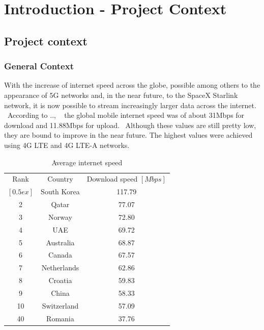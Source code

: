 
\chapter{Introduction - Project Context}
\label{ch:introduction}
\pagestyle{headings}

\section{Project context}
\label{sec:introduction-context}

\subsection{General Context}
\label{subsec:introduction-general-context}
With the increase of internet speed across the globe, possible among others to the appearance of 5G networks and, in
the near future, to the SpaceX Starlink network, it is now possible to stream increasingly larger data across the
internet. \
According to .., \ %
the global mobile internet speed was of about 31Mbps for download and 11.88Mbps for upload. \
Although these values are still pretty low, they are bound to improve in the near future.
The highest values were achieved using 4G LTE and 4G LTE-A networks.

\begin{table}[ht]
    \caption{Average internet speed}
    \centering
    \begin{tabular}{|c|c|c|}
        \hline\hline
        Rank & Country & Download speed $[Mbps]$ \\ $[0.5ex]$
        \hline
        1 & South Korea & 117.79 \\
        2 & Qatar & 77.07  \\
        3 & Norway & 72.80 \\
        4 & UAE & 69.72 \\
        5 & Australia & 68.87 \\
        6 & Canada & 67.57 \\
        7 & Netherlands & 62.86 \\
        8 & Croatia & 59.83 \\
        9 & China & 58.33 \\
        10 & Switzerland & 57.09 \\
        40 & Romania & 37.76
        \hline
    \end{tabular}
    \label{table:internetSpeed}
\end{table}

